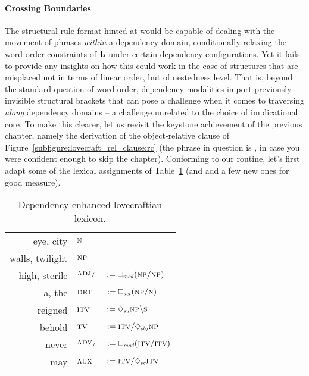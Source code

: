 \paragraph{Crossing Boundaries}
The structural rule format hinted at would be capable of dealing with the movement of phrases \textit{within} a dependency domain, conditionally relaxing the word order constraints of $\textbf{L}$ under certain dependency configurations.
Yet it fails to provide any insights on how this could work in the case of structures that are misplaced not in terms of linear order, but of nestedness level.
That is, beyond the standard question of word order, dependency modalities import previously invisible structural brackets that can pose a challenge when it comes to traversing \textit{along} dependency domains -- a challenge unrelated to the choice of implicational core.
To make this clearer, let us revisit the keystone achievement of the previous chapter, namely the derivation of the object-relative clause of Figure~\ref{subfigure:lovecraft_rel_clause:rc} (the phrase in question is , in case you were confident enough to skip the chapter).
Conforming to our routine, let's first adapt some of the lexical assignments of Table~\ref{table:toy_dep_lexicon} (and add a few new ones for good measure).

\begin{table}
	\centering
	\begin{tabularx}{0.65\textwidth}{@{}r@{\quad::\quad}ll}
		eye, city									& $\smalln$\\
		walls, twilight								& $\smallnp$\\
		high, sterile								& $\textsc{\normalfont\textsc{adj}}_{/}$ & $:=\dbox{mod}(\smallnp\divright\smallnp)$\\
		a, the										& $\textsc{\normalfont\textsc{det}}$ & $:= \dbox{det}(\smallnp\divright\smalln)$\\
		reigned										& $\textsc{\normalfont\textsc{itv}}$ & $:=\ddia{su}\smallnp\divleft\smalls$\\
		behold										& $\textsc{\normalfont\textsc{tv}}$ & $:= \smallgtype{itv}\divright\ddia{obj}\smallnp$\\
		never										& $\textsc{\normalfont\textsc{adv}}_{/}$ & $:= \dbox{mod}(\smallgtype{itv}\divright\smallgtype{itv})$\\
		may											& $\textsc{\normalfont\textsc{aux}}$ & $:= \smallgtype{itv}\divright\ddia{vc}\smallgtype{itv}$
	\end{tabularx}
	\caption{Dependency-enhanced lovecraftian lexicon.}
	\label{table:toy_dep_lexicon}
\end{table}

